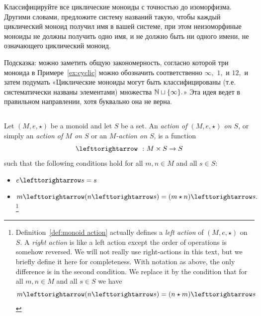 \documentclass[CT4S-EN-RU]{subfiles}
\begin{document}
\begin{exerciseRUS}\label{exc:classify cyclic}
Классифицируйте все циклические моноиды с точностью до изоморфизма. Другими словами, предложите систему названий такую, чтобы каждый циклический моноид получил имя в вашей системе, при этом неизоморфиные моноиды не должны получить одно имя, и не должно быть ни одного имени, не означающего циклический моноид.

Подсказка: можно заметить общую закономерность, согласно которой три моноида в Примере~\ref{ex:cyclic} можно обозначить соответственно $\infty,$ $1,$ и $12,$ и затем подумать «Циклические моноиды могут быть классифицированы (т.е. систематически названы элементами) множества ${\mathbb N}\sqcup\{\infty\}.$» Эта идея ведет в правильном направлении, хотя буквально она не верна.
\end{exerciseRUS}


\subsection{}

\begin{definitionENG}\label{def:monoid action}
Let $(M,e,\star)$ be a monoid and let $S$ be a set. An {\em action of $(M,e,\star)$ on $S$}, or simply an {\em action of $M$ on $S$} or an {\em $M$-action on $S$}, is a function $$\acts\;\;\taking M\times S\to S$$ such that the following conditions hold for all $m,n\in M$ and all $s\in S$:
\begin{itemize}
\item $e\acts s=s$
\item $m\acts(n\acts s)=(m\star n)\acts s.$%
\footnote{Definition~\ref{def:monoid action} actually defines a {\em left action} of $(M,e,\star)$ on $S.$ A {\em right action} is like a left action except the order of operations is somehow reversed. We will not really use right-actions in this text, but we briefly define it here for completeness. With notation as above, the only difference is in the second condition. We replace it by the condition that for all $m,n\in M$ and all $s\in S$ we have
$$m\acts(n\acts s)=(n\star m)\acts s$$}
\end{itemize}
\end{definitionENG}
\end{document}
